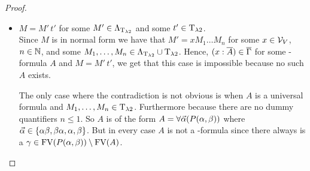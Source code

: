 \begin{proof}
\begin{itemize}
	\item[] \underline{$M=M'\,t'$} for some $M'\in\Lambda_{\text{T}_{\lambda2}}$ and some $t'\in\text{T}_{\lambda2}$.\\
		Since $M$ is in normal form we have that $M'=xM_1\dots M_n$ for some $x\in\mathcal{V}_V$, $n\in\mathbb{N}$, and some $M_1,\dots,M_n\in\Lambda_{\text{T}_{\lambda2}}\cup\text{T}_{\lambda2}$.
		Hence, $(x:\overline{A})\in\overline{\Gamma}$ for some \SysP-formula $A$ and $M=M'\,t'$, we get that this case is impossible because no such $A$ exists.
		
		The only case where the contradiction is not obvious is when $A$ is a universal formula and $M_1,\dots,M_n\in\text{T}_{\lambda2}$. Furthermore because there are no dummy quantifiers $n\leq1$. So $A$ is of the form $A=\forall\predVec(P(\predFst,\predSnd))$ where $\predVec\in\{\predFst\predSnd,\predSnd\predFst,\predFst,\predSnd\}$.
		But in every case $A$ is not a \SysP-formula since there always is a $\gamma\in\FV(P(\predFst,\predSnd))\setminus\FV(A)$.
		
\end{itemize}
\end{proof}

